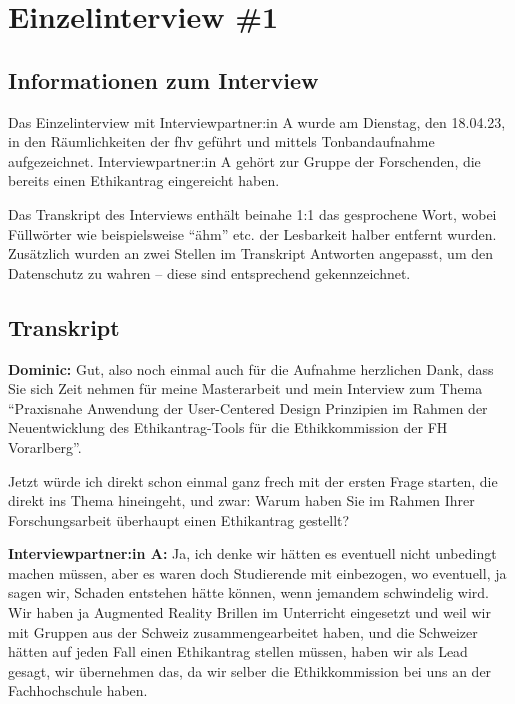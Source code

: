 \documentclass[a4paper,12pt,twoside]{scrreprt}
\begin{document}


\chapter{Einzelinterview \#1}
\label{appendix:interview-1}

\section{Informationen zum Interview}
\label{appendix:interview-1-infos}

Das Einzelinterview mit Interviewpartner:in A wurde am Dienstag, den 18.04.23, in den Räumlichkeiten der \ac{fhv} geführt und mittels Tonbandaufnahme aufgezeichnet. Interviewpartner:in A gehört zur Gruppe der Forschenden, die bereits einen Ethikantrag eingereicht haben.

Das Transkript des Interviews enthält beinahe 1:1 das gesprochene Wort, wobei Füllwörter wie beispielsweise \enquote{ähm} etc. der Lesbarkeit halber entfernt wurden. Zusätzlich wurden an zwei Stellen im Transkript Antworten angepasst, um den Datenschutz zu wahren -- diese sind entsprechend gekennzeichnet.

\section{Transkript}
\label{appendix:interview-1-transkript}

\textbf{Dominic:} Gut, also noch einmal auch für die Aufnahme herzlichen Dank, dass Sie sich Zeit nehmen für meine Masterarbeit und mein Interview zum Thema \enquote{Praxisnahe Anwendung der User-Centered Design Prinzipien im Rahmen der Neuentwicklung des Ethikantrag-Tools für die Ethikkommission der FH Vorarlberg}.

Jetzt würde ich direkt schon einmal ganz frech mit der ersten Frage starten, die direkt ins Thema hineingeht, und zwar: Warum haben Sie im Rahmen Ihrer Forschungsarbeit überhaupt einen Ethikantrag gestellt?

\textbf{Interviewpartner:in A:} Ja, ich denke wir hätten es eventuell nicht unbedingt machen müssen, aber es waren doch Studierende mit einbezogen, wo eventuell, ja sagen wir, Schaden entstehen hätte können, wenn jemandem schwindelig wird. Wir haben ja Augmented Reality Brillen im Unterricht eingesetzt und weil wir mit Gruppen aus der Schweiz zusammengearbeitet haben, und die Schweizer hätten auf jeden Fall einen Ethikantrag stellen müssen, haben wir als Lead gesagt, wir übernehmen das, da wir selber die Ethikkommission bei uns an der Fachhochschule haben.
\end{document}
